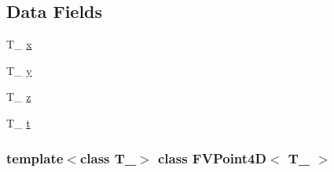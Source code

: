 \subsection*{Data Fields}
\begin{DoxyCompactItemize}
\item 
T\_\- \hyperlink{classFVPoint4D_a4333b1040efe8cd32f7c76bfc2269e0d}{x}
\item 
T\_\- \hyperlink{classFVPoint4D_ab4943c75e718fe503722ac7d26c746a6}{y}
\item 
T\_\- \hyperlink{classFVPoint4D_a28ebcfb48d1adbaee6863174eaeeec7f}{z}
\item 
T\_\- \hyperlink{classFVPoint4D_a515c82762faf64753a10602abe4d76c4}{t}
\end{DoxyCompactItemize}
\subsubsection*{template$<$class T\_\-$>$ class FVPoint4D$<$ T\_\- $>$}



